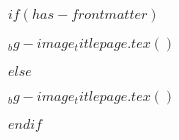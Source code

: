 $if(has-frontmatter)$
  \begin{frontmatter}
    \begin{titlepage}
      $_bg-image_titlepage.tex()$
    \end{titlepage}
  \end{frontmatter}
$else$
  \begin{titlepage}
    $_bg-image_titlepage.tex()$
  \end{titlepage}
$endif$
